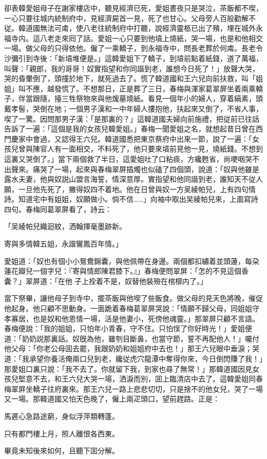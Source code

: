 卻表韓愛姐母子在謝家樓店中，聽見經濟已死，愛姐晝夜只是哭泣，茶飯都不喫，一心只要往城内統制府中，見經濟屍首一見，死了也甘心。父母旁人百般勸解不従。韓道國無法可䖏，使八老往統制府中打聽，說經濟靈柩已出了殯，埋在城外永福寺内。這八老走來囘了話。愛姐一心只要到他墳上燒紙，哭一場，也是和他相交一場。做父母的只得依他。僱了一乘轎子，到永福寺中，問長老葬於何䖏。長老令沙彌引到寺後：「新墳堆便是。」這韓愛姐下了轎子，到墳前點着紙錢，道了萬福，叫聲：「親郎，我的哥哥！奴實指望和你同諧到老，誰想今日死了！」放聲大哭，哭的昏暈倒了，頭撞於地下，就死過去了。慌了韓道國和王六兒向前扶救，叫「姐姐」叫不應，越發慌了。不想那日，正是葬了三日，春梅與渾家葛翠屏坐着兩乘轎子，伴當跟隨，擡三牲祭物來與他煖墓燒紙。看見一個年小的婦人，穿着縞素，頭戴孝髻，哭倒在地；一個男子漢和一中年婦人摟抱他，扶起來又倒了，不省人事，喫了一驚。因問那男子漢：「是那裏的？」這韓道國夫婦向前施禮，把従前已往話告訴了一遍：「這個是我的女孩兒韓愛姐。」春梅一聞愛姐之名，就想起昔日曾在西門慶家中會過，又認得王六兒。韓道國悉把東京蔡府中出來一節，說了一遍：「女孩兒曾與陳官人有一面相交，不料死了，他只要來墳前見他一見，燒紙錢。不想到這裏又哭倒了。」當下兩個救了半日，這愛姐吐了口粘痰，方纔甦省，尚哽咽哭不出聲來。痛哭了一場，起來與春梅翠屏插燭也似磕了四個頭，說道：「奴與他雖是露水夫妻，他與奴説山盟言海誓，情深意厚。實指望和他同諧到老，誰知天不従人願，一旦他先死了，撇得奴四不着地。他在日曾與奴一方吴綾帕兒，上有四句情詩。知道宅中有姐姐，奴願做小。倘不信……」向袖中取出吴綾帕兒來，上面寫詩四句。春梅同葛翠屏看了，詩云：

\begin{myquote}
「吴綾帕兒織迴紋，洒翰揮毫墨跡新。

寄與多情韓五姐，永諧鸞鳳百年情。」
\end{myquote}

愛姐道：「奴也有個小小鴛鴦錦囊，與他佩帶在身邊。兩個都扣繡着並頭蓮，每朶蓮花瓣兒一個字兒：『寄與情郎陳君膝下。』」春梅便問翠屏：「怎的不見這個香囊？」翠屏道：「在他𧜽子上拴着不是，奴替他裝殮在棺槨内了。」

當下祭畢，讓他母子到寺中，擺茶飯與他喫了些飯食。做父母的見天色將晚，催促他起身。他只顧不思動身。一面跪着春梅葛翠屏哭說：「情願不歸父母，同姐姐守孝寡居，也是奴和他恩情一場，活是他妻小，死傍他魂靈。」那翠屏只顧不言語。春梅便說：「我的姐姐，只怕年小青春，守不住。只怕悮了你好時光！」愛姐便道：「奶奶説那裏話。奴旣為他，雖刳目斷鼻，也當守節，誓不再配他人！」囑付他父母：「你老公母囬去罷，我跟奶奶和姐姐府中去也！」那王六兒眼中垂淚；哭道：「我承望你養活俺兩口兒到老，纔従虎穴龍潭中奪得你來，今日倒閃賺了我！」那愛姐口裏只說：「我不去了。你就留下我，到家也尋了無常！」那韓道國因見女孩兒堅意不去，和王六兒大哭一場，洒淚而別，囬上臨清店中去了。這韓愛姐同春梅翠屛坐轎子往府裏來。那王六兒一路上悲悲切切，只是捨不的他女兒，哭了一場又一場。那韓道國又怕天色晚了，僱上兩疋頭口，望前趕路。正是：

\begin{myquote}
馬遲心急路途窮，身似浮萍類轉蓬。

只有都門樓上月，照人離恨各西東。
\end{myquote}

畢竟未知後來如何，且聽下囬分解。

